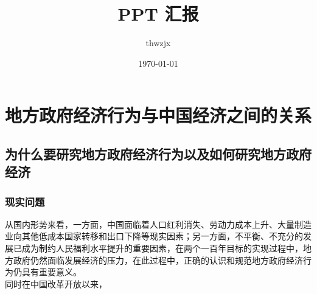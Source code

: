 \documentclass[11pt]{article}
\author{thwzjx}
\date{\today}
\title{PPT 汇报}
\begin{document}
\maketitle
\tableofcontents

\section{地方政府经济行为与中国经济之间的关系}
\label{sec:org0320f0e}
\subsection{为什么要研究地方政府经济行为以及如何研究地方政府经济}
\label{sec:orgd44bd1c}
\subsubsection{现实问题}
\label{sec:orgc67ebc4}
  从国内形势来看，一方面，中国面临着人口红利消失、劳动力成本上升、大量制造业向其他低成本国家转移和出口下降等现实因素；另一方面，不平衡、不充分的发展已成为制约人民福利水平提升的重要因素，在两个一百年目标的实现过程中，地方政府仍然面临发展经济的压力，在此过程中，正确的认识和规范地方政府经济行为仍具有重要意义。\\
同时在中国改革开放以来，
\end{document}
